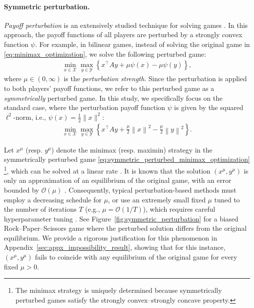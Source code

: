 \documentclass{article}
\newcommand{\X}{\mathcal{X}}
\newcommand{\Y}{\mathcal{Y}}
\theoremstyle{plain}
\begin{document}
\paragraph{Symmetric perturbation.}
\emph{Payoff perturbation} is an extensively studied technique for solving games \citep{facchinei2003finite,liu2022power}.
In this approach, the payoff functions of all players are perturbed by a strongly convex function $\psi$.
For example, in bilinear games, instead of solving the original game in \eqref{eq:minimax_optimization}, we solve the following perturbed game:
\begin{align*}
    \min_{x\in \X}\max_{y\in \Y} \left\{x^{\top}Ay + \mu\psi(x) - \mu\psi(y)\right\},
\end{align*}
where $\mu\in (0, \infty)$ is the \emph{perturbation strength}.
Since the perturbation is applied to both players' payoff functions, we refer to this perturbed game as a \emph{symmetrically} perturbed game.
In this study, we specifically focus on the standard case, where the perturbation payoff function $\psi$ is given by the squared $\ell^2$-norm, i.e., $\psi(x)=\frac{1}{2}\|x\|^2$:
\begin{align}
    \min_{x\in \X}\max_{y\in \Y} \left\{x^{\top}Ay + \frac{\mu}{2}\left\|x\right\|^2 - \frac{\mu}{2}\left\|y\right\|^2\right\}.
    \label{eq:symmetric_perturbed_minimax_optimization}
\end{align}

Let $x^{\mu}$ (resp. $y^{\mu}$) denote the minimax (resp. maximin) strategy in the symmetrically perturbed game \eqref{eq:symmetric_perturbed_minimax_optimization} \footnote{
    The minimax strategy is uniquely determined because symmetrically perturbed games satisfy the strongly convex–strongly concave property.}, which can be solved
at a linear rate \citep{cen2021fast,cen2022faster,pmlr-v206-pattathil23a,sokota2022unified}.
It is known that the solution $(x^{\mu}, y^{\mu})$ is only an approximation of an equilibrium of the original game, with an error bounded by $\mathcal{O}(\mu)$ \citep{liu2022power,abe2024slingshot}.
Consequently, typical perturbation-based methods must employ a decreasing schedule for $\mu$, or use an extremely small fixed $\mu$ tuned to the number of iterations $T$ (e.g., $\mu=\mathcal{O}(1/T)$), which requires careful hyperparameter tuning \citep{tatarenko2019learning,bernasconi2024learning,cai2023uncoupled}.
See Figure~\ref{fig:symmetric_perturbation} for a biased Rock–Paper–Scissors game where the perturbed solution differs from the original equilibrium.
We provide a rigorous justification for this phenomenon in Appendix~\ref{sec:appx_impossibility_result}, showing that for this instance, $(x^{\mu},y^{\mu})$ fails to coincide with any equilibrium of the original game for every fixed $\mu>0$.
\end{document}
